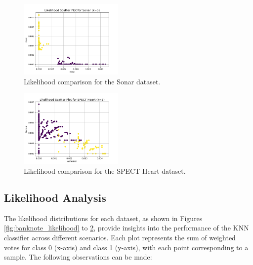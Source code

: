 \documentclass[conference]{IEEEtran}
\begin{document}
\begin{figure}[htbp]
    \centering
    \includegraphics[width=0.45\textwidth]{../scripts/comparison_results/Sonar_likelihood.png}
    \caption{Likelihood comparison for the Sonar dataset.}
    \label{fig:sonar_likelihood}
\end{figure}

\begin{figure}[htbp]
    \centering
    \includegraphics[width=0.45\textwidth]{../scripts/comparison_results/SPECT Heart_likelihood.png}
    \caption{Likelihood comparison for the SPECT Heart dataset.}
    \label{fig:spect_heart_likelihood}
\end{figure}

\subsection{Likelihood Analysis}

The likelihood distributions for each dataset, as shown in Figures \ref{fig:banknote_likelihood} to \ref{fig:spect_heart_likelihood}, provide insights into the performance of the KNN classifier across different scenarios. Each plot represents the sum of weighted votes for class 0 (x-axis) and class 1 (y-axis), with each point corresponding to a sample. The following observations can be made:
\end{document}
